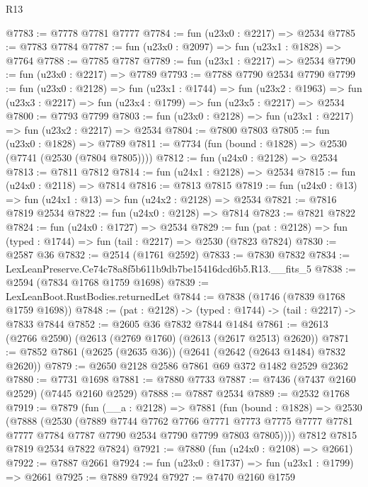 \begin{lexlean}{R13}
\begin{coremodule}
@7783 := @7778 @7781 @7777
@7784 := fun (u23x0 : @2217) => @2534
@7785 := @7783 @7784
@7787 := fun (u23x0 : @2097) => fun (u23x1 : @1828) => @7764
@7788 := @7785 @7787
@7789 := fun (u23x1 : @2217) => @2534
@7790 := fun (u23x0 : @2217) => @7789
@7793 := @7788 @7790 @2534 @7790
@7799 := fun (u23x0 : @2128) =>
  fun (u23x1 : @1744) =>
  fun (u23x2 : @1963) => fun (u23x3 : @2217) => fun (u23x4 : @1799) => fun (u23x5 : @2217) => @2534
@7800 := @7793 @7799
@7803 := fun (u23x0 : @2128) => fun (u23x1 : @2217) => fun (u23x2 : @2217) => @2534
@7804 := @7800 @7803
@7805 := fun (u23x0 : @1828) => @7789
@7811 := @7734 (fun (bound : @1828) => @2530 (@7741 (@2530 (@7804 @7805))))
@7812 := fun (u24x0 : @2128) => @2534
@7813 := @7811 @7812
@7814 := fun (u24x1 : @2128) => @2534
@7815 := fun (u24x0 : @2118) => @7814
@7816 := @7813 @7815
@7819 := fun (u24x0 : @13) => fun (u24x1 : @13) => fun (u24x2 : @2128) => @2534
@7821 := @7816 @7819 @2534
@7822 := fun (u24x0 : @2128) => @7814
@7823 := @7821 @7822
@7824 := fun (u24x0 : @1727) => @2534
@7829 := fun (pat : @2128) => fun (typed : @1744) => fun (tail : @2217) => @2530 (@7823 @7824)
@7830 := @2587 @36
@7832 := @2514 (@1761 @2592)
@7833 := @7830 @7832
@7834 := LexLeanPreserve.Ce74c78a8f5b611b9db7be15416dcd6b5.R13.__fits_5
@7838 := @2594 (@7834 @1768 @1759 @1698)
@7839 := LexLeanBoot.RustBodies.returnedLet
@7844 := @7838 (@1746 (@7839 @1768 @1759 @1698))
@7848 := (pat : @2128) -> (typed : @1744) -> (tail : @2217) -> @7833 @7844
@7852 := @2605 @36 @7832 @7844 @1484
@7861 := @2613 (@2766 @2590) (@2613 (@2769 @1760) (@2613 (@2617 @2513) @2620))
@7871 := @7852 @7861 (@2625 (@2635 @36)) (@2641 (@2642 (@2643 @1484) @7832 @2620))
@7879 := @2650 @2128 @2586 @7861 @69 @372 @1482 @2529 @2362
@7880 := @7731 @1698
@7881 := @7880 @7733
@7887 := @7436 (@7437 @2160 @2529) (@7445 @2160 @2529)
@7888 := @7887 @2534
@7889 := @2532 @1768
@7919 := @7879
    (fun (__a : @2128) =>
    @7881
      (fun (bound : @1828) =>
      @2530
        (@7888
          (@2530
            (@7889
              @7744
              @7762
              @7766
              @7771
              @7773
              @7775
              @7777
              @7781
              @7777
              @7784
              @7787
              @7790
              @2534
              @7790
              @7799
              @7803
              @7805))))
      @7812
      @7815
      @7819
      @2534
      @7822
      @7824)
@7921 := @7880 (fun (u24x0 : @2108) => @2661)
@7922 := @7887 @2661
@7924 := fun (u23x0 : @1737) => fun (u23x1 : @1799) => @2661
@7925 := @7889 @7924
@7927 := @7470 @2160 @1759

\end{coremodule}
\end{lexlean}

